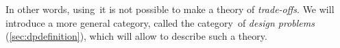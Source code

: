 In other words, using~\Pos it is not possible to make a theory of \emph{trade-offs}. We will introduce a more general category, called the category~\DP of \emph{design problems} (\cref{sec:dpdefinition}), which will allow to describe such a theory.



